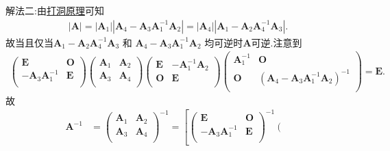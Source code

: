 \documentclass[../../main.tex]{subfiles}
\begin{document}
\begin{solution}
{\color{blue}解法二:}由\hyperref[proposition:打洞原理]{打洞原理}可知
\begin{align*}
|\boldsymbol{A}|=\left| \boldsymbol{A}_1 \right|| \boldsymbol{A}_4-\boldsymbol{A}_3\boldsymbol{A}_{1}^{-1}\boldsymbol{A}_2 |=\left| \boldsymbol{A}_4 \right|| \boldsymbol{A}_1-\boldsymbol{A}_2\boldsymbol{A}_{4}^{-1}\boldsymbol{A}_3 |.
\end{align*}
故当且仅当\(\boldsymbol{A}_1 - \boldsymbol{A}_2\boldsymbol{A}_4^{-1}\boldsymbol{A}_3\) 和 \(\boldsymbol{A}_4 - \boldsymbol{A}_3\boldsymbol{A}_1^{-1}\boldsymbol{A}_2\) 均可逆时$\boldsymbol{A}$可逆.注意到
\begin{align*}
\left( \begin{matrix}
\boldsymbol{E}&		\boldsymbol{O}\\
-\boldsymbol{A}_3\boldsymbol{A}_{1}^{-1}&		\boldsymbol{E}\\
\end{matrix} \right) \left( \begin{matrix}
\boldsymbol{A}_1&		\boldsymbol{A}_2\\
\boldsymbol{A}_3&		\boldsymbol{A}_4\\
\end{matrix} \right) \left( \begin{matrix}
\boldsymbol{E}&		-\boldsymbol{A}_{1}^{-1}\boldsymbol{A}_2\\
\boldsymbol{O}&		\boldsymbol{E}\\
\end{matrix} \right) \left( \begin{matrix}
\boldsymbol{A}_{1}^{-1}&		\boldsymbol{O}\\
\boldsymbol{O}&		\left( \boldsymbol{A}_4-\boldsymbol{A}_3\boldsymbol{A}_{1}^{-1}\boldsymbol{A}_2 \right) ^{-1}\\
\end{matrix} \right) =\boldsymbol{E}.
\end{align*}
故
\begin{align*}
\boldsymbol{A}^{-1}&=\left( \begin{matrix}
\boldsymbol{A}_1&		\boldsymbol{A}_2\\
\boldsymbol{A}_3&		\boldsymbol{A}_4\\
\end{matrix} \right) ^{-1}=\left[ \left( \begin{matrix}
\boldsymbol{E}&		\boldsymbol{O}\\
-\boldsymbol{A}_3\boldsymbol{A}_{1}^{-1}&		\boldsymbol{E}\\
\end{matrix} \right) ^{-1}\left( \begin{matrix}

\end{matrix}
\end{align*}
\end{solution}
\end{document}
